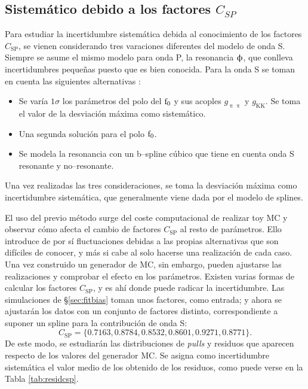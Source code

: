 \subsection{Sistemático debido a los factores $C_{SP}$}


Para estudiar la incertidumbre sistemática debida al conocimiento de los factores $C_{\text{SP}}$, se vienen considerando tres varaciones diferentes del modelo de onda S. Siempre se asume el mismo modelo para onda P, la resonancia $\upphi$, que conlleva incertidumbres pequeñas puesto que es bien conocida. Para la onda S se toman en cuenta las siguientes alternativas \cite{paperPhis}:
\begin{itemize}
  \item Se varía $1 \sigma$ los parámetros del polo del $\text{f}_0$ y sus acoples $g_{\uppi \uppi}$ y $g_{\text{KK}}$. Se toma el valor de la desviación máxima como sistemático.
  \item Una segunda solución para el polo $\text{f}_0$.
  \item Se modela la resonancia con un b--spline cúbico que tiene en cuenta onda S resonante y no--resonante.
\end{itemize}
Una vez realizadas las tres consideraciones, se toma la desviación máxima como incertidumbre sistemática, que generalmente viene dada por el modelo de splines.

El uso del previo método surge del coste computacional de realizar toy MC y observar cómo afecta el cambio de factores $C_{\text{SP}}$ al resto de parámetros. Ello introduce de por sí fluctuaciones debidas a las propias alternativas que son difíciles de conocer, y más si cabe al solo hacerse una realización de cada caso. Una vez construido un generador de MC, sin embargo, pueden ajustarse las realizaciones y comprobar el efecto en los parámetros.
Existen varias formas de calcular los factores $C_{\text{SP}}$, y es ahí donde puede radicar la incertidumbre. Las simulaciones de \S \ref{sec:fitbias} toman unos factores, como entrada; y ahora se ajustarán los datos con un conjunto de factores distinto, correspondiente a suponer un spline para la contribución de onda S:
\[C_{\text{SP}} = \{0.7163, 0.8784, 0.8532, 0.8601, 0.9271, 0.8771 \}.\]
De este modo, se estudiarán las distribuciones de \textit{pulls} y residuos que aparecen respecto de los valores del generador MC. Se asigna como incertidumbre sistemática el valor medio de los obtenido de los residuos, como puede verse en la Tabla \ref{tab:residcsp}.


